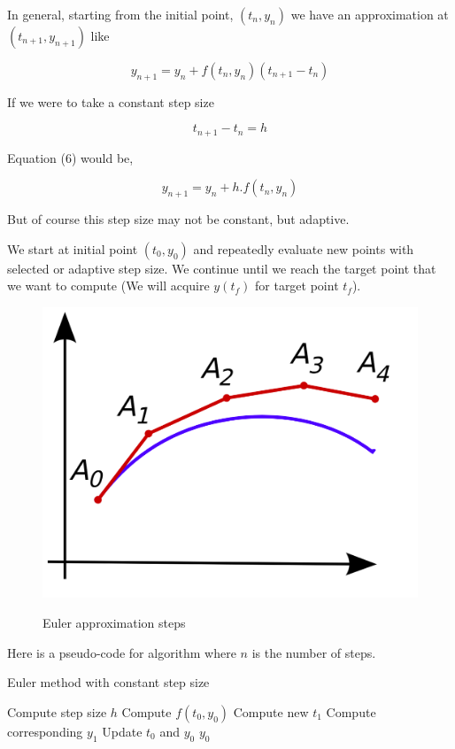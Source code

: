 \documentclass[a4paper]{article}
\begin{document}
In general, starting from the initial point, $ (t_n, y_n) $ we have an approximation at $ (t_{n + 1}, y_{n + 1}) $ like

\begin{equation}
	y_{n + 1} = y_n + f(t_n, y_n)(t_{n + 1} - t_n)
\end{equation}

If we were to take a constant step size

\begin{equation}
	t_{n + 1} - t_n = h
\end{equation}

Equation (6) would be,

\begin{equation}
	y_{n + 1} = y_n + h.f(t_n, y_n)
\end{equation}

But of course this step size may not be constant, but adaptive.

We start at initial point $ (t_0, y_0) $ and repeatedly evaluate new points with selected or adaptive step size. We continue until we reach the target point that we want to compute (We will acquire $ y(t_f) $ for target point $ t_f $).

\begin{figure}[ht]
	\centering
    \includegraphics[scale=0.2]{euler.png}
    \label{euler}
    \caption{Euler approximation steps}
\end{figure}

Here is a pseudo-code for algorithm where $n$ is the number of steps.

\begin{algorithm}
    \caption{Euler method with constant step size}
    \begin{algorithmic}[1]
            \State Compute step size $h$
                \State Compute $f(t_0, y_0)$
                \State Compute new $t_1$
                \State Compute corresponding $y_1$
                \State Update $t_0$ and $y_0$
            \EndFor
            \State \Return $y_0$
        \EndFunction
    \end{algorithmic}
\end{algorithm}
\end{document}
